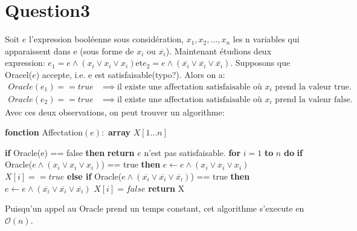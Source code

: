 \documentclass{article}
\theoremstyle{definition}
\theoremstyle{remark}
\begin{document}
\section*{Question3}
Soit $e$ l'expression booléenne sous considération, $x_1,x_2,\ldots, x_{n}$ les n variables qui apparaissent dans e (sous forme de $x_{i}$ ou $\overline{x_{i}}$). Maintenant étudions deux expression: $e_1 = e\wedge \left( x_{i} \vee x_{i} \vee x_{i} \right)  \text{et} e_2 = e \wedge \left( \overline{x_{i}} \vee\overline{x_{i}} \vee\overline{x_{i}}  \right)$. Supposons que Oracel($e$) accepte, i.e. e est satisfaisable(typo?). Alors on a:
\begin{align*}
	Oracle(e_1) == true &\implies \text{il existe une affectation satisfaisable où $x_{i}$ prend la valeur true.} \\  
	Oracle(e_2) == true &\implies \text{il existe une affectation satisfaisable où $x_{i}$ prend la valeur false.}   
.\end{align*}
Avec ces deux observations, on peut trouver un algorithme:\\
    \begin{algorithm} 
	\caption{\textbf{fonction} Affectation$(e):$ \textbf{array} $X[1\ldots n]$}
	\label{affectation_algo} 
	\begin{algorithmic}
		\STATE {}
		\STATE \textbf{if} Oracle(e) == false \textbf{then}
		\STATE \textbf{return} $e$ n'est pas satisfaisable.
		\STATE \textbf{for} $i = 1$ \textbf{to} $n$ \textbf{do}
		\STATE \qquad \textbf{if} Oracle($e\wedge \left( x_{i} \vee x_{i} \vee x_{i} \right)$) == true \textbf{then} 
		\STATE \qquad\qquad $e\gets e\wedge \left( x_{i} \vee x_{i} \vee x_{i} \right)$
		\STATE \qquad\qquad $X\left [ i \right ] == true $
		\STATE \qquad \textbf{else if} Oracle($e\wedge (\overline{x_{i}} \vee \overline{x_{i}} \vee \overline{x_{i}} )$) == true \textbf{then} 
		\STATE \qquad\qquad $e\gets e\wedge \left(\overline{x_{i}} \vee \overline{x_{i}} \vee \overline{x_{i}} \right)$
		\STATE \qquad\qquad $X\left [ i \right ] = false $
		\STATE \textbf{return} X
	
	\end{algorithmic} 
    \end{algorithm}
    Puisqu'un appel au Oracle prend un temps constant, cet algorithme s'execute en $\mathcal{O} \left ( n \right ) $.
\end{document}
